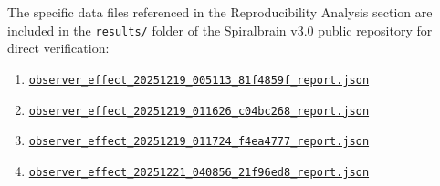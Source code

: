 \documentclass[12pt,a4paper]{article}
\begin{document}
The specific data files referenced in the Reproducibility Analysis section are included in the \texttt{results/} folder of the Spiralbrain v3.0 public repository for direct verification: 

\begin{enumerate}
    \item \href{https://github.com/jhcragin/SpiralBrain-v3.0-public/blob/main/Embodied%20Extension%20of%20Regulatory%20Intelligence/results/observer_effect_20251219_005113_81f4859f_report.json}{\texttt{observer\_effect\_20251219\_005113\_81f4859f\_report.json}}
    \item \href{https://github.com/jhcragin/SpiralBrain-v3.0-public/blob/main/Embodied%20Extension%20of%20Regulatory%20Intelligence/results/observer_effect_20251219_011626_c04bc268_report.json}{\texttt{observer\_effect\_20251219\_011626\_c04bc268\_report.json}}
    \item \href{https://github.com/jhcragin/SpiralBrain-v3.0-public/blob/main/Embodied%20Extension%20of%20Regulatory%20Intelligence/results/observer_effect_20251219_011724_f4ea4777_report.json}{\texttt{observer\_effect\_20251219\_011724\_f4ea4777\_report.json}}
    \item \href{https://github.com/jhcragin/SpiralBrain-v3.0-public/blob/main/Embodied%20Extension%20of%20Regulatory%20Intelligence/results/observer_effect_20251221_040856_21f96ed8_report.json}{\texttt{observer\_effect\_20251221\_040856\_21f96ed8\_report.json}}
\end{enumerate}





\end{document}
